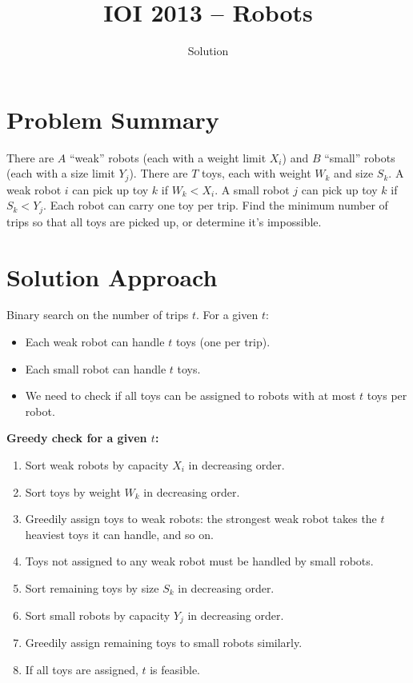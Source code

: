 \documentclass[11pt,a4paper]{article}
\title{IOI 2013 -- Robots}
\author{Solution}
\date{}
\begin{document}
\maketitle

\section{Problem Summary}
There are $A$ ``weak'' robots (each with a weight limit $X_i$) and $B$ ``small'' robots (each with a size limit $Y_j$). There are $T$ toys, each with weight $W_k$ and size $S_k$. A weak robot $i$ can pick up toy $k$ if $W_k < X_i$. A small robot $j$ can pick up toy $k$ if $S_k < Y_j$. Each robot can carry one toy per trip. Find the minimum number of trips so that all toys are picked up, or determine it's impossible.

\section{Solution Approach}
Binary search on the number of trips $t$. For a given $t$:
\begin{itemize}
    \item Each weak robot can handle $t$ toys (one per trip).
    \item Each small robot can handle $t$ toys.
    \item We need to check if all toys can be assigned to robots with at most $t$ toys per robot.
\end{itemize}

\textbf{Greedy check for a given $t$:}
\begin{enumerate}
    \item Sort weak robots by capacity $X_i$ in decreasing order.
    \item Sort toys by weight $W_k$ in decreasing order.
    \item Greedily assign toys to weak robots: the strongest weak robot takes the $t$ heaviest toys it can handle, and so on.
    \item Toys not assigned to any weak robot must be handled by small robots.
    \item Sort remaining toys by size $S_k$ in decreasing order.
    \item Sort small robots by capacity $Y_j$ in decreasing order.
    \item Greedily assign remaining toys to small robots similarly.
    \item If all toys are assigned, $t$ is feasible.
\end{enumerate}
\end{document}
